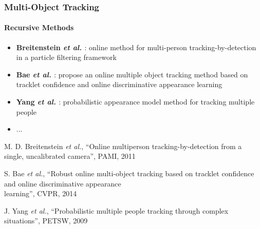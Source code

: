 \begin{frame}
	\frametitle{Multi-Object Tracking}
	\framesubtitle{Recursive Methods}
	
	\Large
	
	\vspace{0.05cm}
	
	\begin{itemize}
		\item \textbf{Breitenstein \emph{et al.} \cite{Breitenstein11}}: online method for
			  multi-person tracking-by-detection in a particle filtering framework
		\item \textbf{Bae \emph{et al.} \cite{Bae14}}: propose an online multiple object
			  tracking method based on tracklet confidence and online discriminative appearance learning
		\item \textbf{Yang \emph{et al.} \cite{Yang09}}: probabilistic appearance model
			  method for tracking multiple people
		\item ...
	\end{itemize}
	
	\vspace{0.15cm}
	
	\tiny
	
	\cite{Breitenstein11} M. D. Breitenstein \emph{et al.}, ``Online multiperson tracking-by-detection
	from a single, uncalibrated camera'', PAMI, 2011
	
	\cite{Bae14} S. Bae \emph{et al.}, ``Robust online multi-object tracking based on tracklet
	confidence and online discriminative appearance\\ \hspace{0.25cm} learning'', CVPR, 2014
	
	\cite{Yang09} J. Yang \emph{et al.}, ``Probabilistic multiple people tracking through complex
	situations'', PETSW, 2009\\
\end{frame}

